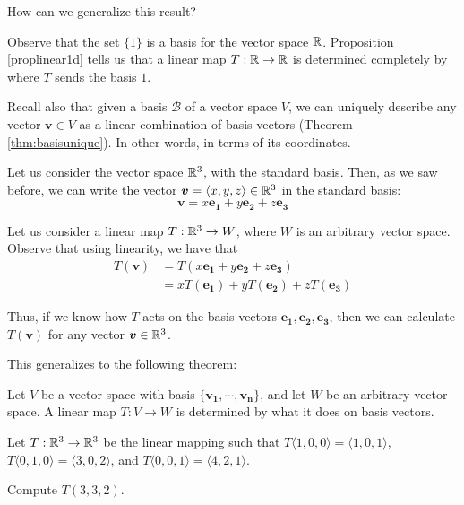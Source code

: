     \begin{motivating}
    How can we generalize this result?
    \end{motivating}

    Observe that the set $\{1\}$ is a basis for the vector space $\mathbb{R}$.  Proposition \ref{proplinear1d} tells us that a linear map $T: \mathbb{R} \to \mathbb{R}$ is determined completely by where $T$ sends the basis $1$.  
    
    Recall also that given a basis $\mathcal{B}$ of a vector space $V$, we can uniquely describe any vector $\bm{v} \in V$ as a linear combination of basis vectors (Theorem \ref{thm:basisunique}).  In other words, in terms of its coordinates.
    
    \begin{example}
    Let us consider the vector space $\mathbb{R}^3$, with the standard basis.  Then, as we saw before, we can write the vector $\bm{v} = \langle x, y,z \rangle \in \mathbb{R}^3$ in the standard basis:
    $$\bm{v} = x\bm{e_1} + y\bm{e_2} + z\bm{e_3}$$
    
    Let us consider a linear map $T : \mathbb{R}^3 \to W$, where $W$ is an arbitrary vector space.  Observe that using linearity, we have that
    \begin{align*}
        T(\bm{v}) &= T(x\bm{e_1} + y\bm{e_2} + z\bm{e_3}) \\
        &= xT(\bm{e_1}) + yT(\bm{e_2}) + zT(\bm{e_3})
    \end{align*}
    
    Thus, if we know how $T$ acts on the basis vectors $\bm{e_1}, \bm{e_2}, \bm{e_3}$, then we can calculate $T(\bm{v})$ for any vector $\bm{v} \in \mathbb{R}^3$.  
    
    \end{example}

    This generalizes to the following theorem:
    
    \begin{theorem}
    Let $V$ be a vector space with basis $\{\bm{v_1}, \cdots, \bm{v_n}\}$, and let $W$ be an arbitrary vector space.  A linear map $T: V \to W$ is determined by what it does on basis vectors.
    \end{theorem}

    \begin{example}
    Let $T : \mathbb{R}^3 \to \mathbb{R}^3$ be the linear mapping such that $T\langle1,0,0\rangle = \langle1,0,1\rangle$, $T\langle0,1,0\rangle = \langle3,0,2\rangle$, and $T\langle0,0,1\rangle = \langle4,2,1\rangle$. 
    
    Compute $T(3, 3, 2)$.
    \end{example}





